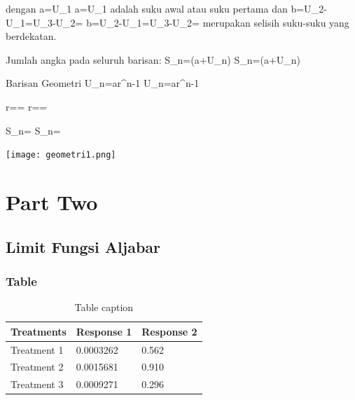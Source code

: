 \documentclass[11pt,fleqn]{book} %
\begin{document}
dengan {\displaystyle a=U_{1}} {\displaystyle a=U_{1}} adalah suku awal atau suku pertama dan {\displaystyle b=U_{2}-U_{1}=U_{3}-U_{2}=\dotsb } {\displaystyle b=U_{2}-U_{1}=U_{3}-U_{2}=\dotsb } merupakan selisih suku-suku yang berdekatan.

Jumlah angka pada seluruh barisan: {\displaystyle S_{n}={}\times (a+U_{n})} {\displaystyle S_{n}={}\times (a+U_{n})}

Barisan Geometri
{\displaystyle U_{n}=ar^{n-1}} {\displaystyle U_{n}=ar^{n-1}}

{\displaystyle r={}={}} {\displaystyle r={}={}}

{\displaystyle S_{n}={}} {\displaystyle S_{n}={}}

\texttt{[image: geometri1.png]} 


\part{Part Two}



\chapter{Limit Fungsi Aljabar}

\section{Table}

\begin{table}[h]
\centering
\begin{tabular}{l l l}
\toprule
\textbf{Treatments} & \textbf{Response 1} & \textbf{Response 2}\\
\midrule
Treatment 1 & 0.0003262 & 0.562 \\
Treatment 2 & 0.0015681 & 0.910 \\
Treatment 3 & 0.0009271 & 0.296 \\
\bottomrule
\end{tabular}
\caption{Table caption}
\end{table}
\end{document}
